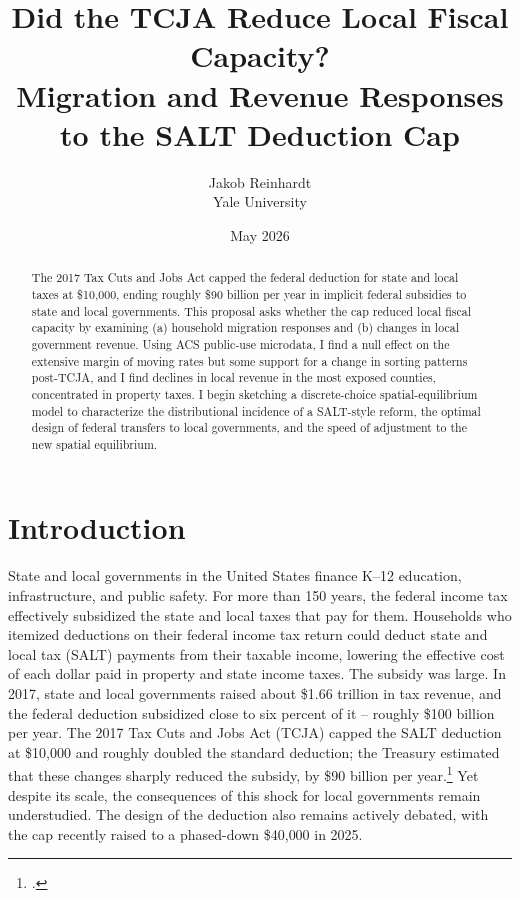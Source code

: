 \documentclass[12pt]{article}
\title{Did the TCJA Reduce Local Fiscal Capacity? \\[0.3em]
\large Migration and Revenue Responses to the SALT Deduction Cap}
\author{Jakob Reinhardt\\ Yale University}
\date{May 2026}
\begin{document}
\maketitle

\begin{abstract}
\noindent The 2017 Tax Cuts and Jobs Act capped the federal deduction for state and local taxes at \$10{,}000, ending roughly \$90 billion per year in implicit federal subsidies to state and local governments. This proposal asks whether the cap reduced local fiscal capacity by examining (a) household migration responses and (b) changes in local government revenue. Using ACS public-use microdata, I find a null effect on the extensive margin of moving rates but some support for a change in sorting patterns post-TCJA, and I find declines in local revenue in the most exposed counties, concentrated in property taxes. I begin sketching a discrete-choice spatial-equilibrium model to characterize the distributional incidence of a SALT-style reform, the optimal design of federal transfers to local governments, and the speed of adjustment to the new spatial equilibrium.
\end{abstract}

\thispagestyle{empty}
\clearpage
\setcounter{page}{1}


\section{Introduction}

State and local governments in the United States finance K--12 education, infrastructure, and public safety. For more than 150 years, the federal income tax effectively subsidized the state and local taxes that pay for them. Households who itemized deductions on their federal income tax return could deduct state and local tax (SALT) payments from their taxable income, lowering the effective cost of each dollar paid in property and state income taxes. The subsidy was large. In 2017, state and local governments raised about \$1.66 trillion in tax revenue, and the federal deduction subsidized close to six percent of it -- roughly \$100 billion per year. The 2017 Tax Cuts and Jobs Act (TCJA) capped the SALT deduction at \$10{,}000 and roughly doubled the standard deduction; the Treasury estimated that these changes sharply reduced the subsidy, by \$90 billion per year.\footnote{\citet{Treasury2020TaxExpenditures}.} Yet despite its scale, the consequences of this shock for local governments remain understudied. The design of the deduction also remains actively debated, with the cap recently raised to a phased-down \$40{,}000 in 2025.
\end{document}
